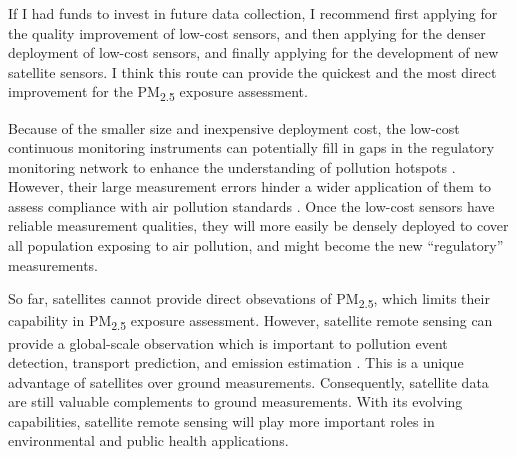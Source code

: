 \documentclass[11pt]{article}
\newcommand{\tsub}{\textsubscript}
\begin{document}
\begin{enumerate*}[{[a)]}]
    \item If I had funds to invest in future data collection, I recommend first applying for the quality improvement of low-cost sensors, and then applying for the denser deployment of low-cost sensors, and finally applying for the development of new satellite sensors. I think this route can provide the quickest and the most direct improvement for the PM\tsub{2.5} exposure assessment. 
    
    Because of the smaller size and inexpensive deployment cost, the low-cost continuous monitoring instruments can potentially fill in gaps in the regulatory monitoring network to enhance the understanding of pollution hotspots \citep{gao2015distributed}. However, their large measurement errors hinder a wider application of them to assess compliance with air pollution standards \citep{hall2014integrating}. Once the low-cost sensors have reliable measurement qualities, they will more easily be densely deployed to cover all population exposing to air pollution, and might become the new ``regulatory'' measurements. 
    
    So far, satellites cannot provide direct obsevations of PM\tsub{2.5}, which limits their capability in PM\tsub{2.5} exposure assessment. However, satellite remote sensing can provide a global-scale observation which is important to pollution event detection, transport prediction, and emission estimation \citep{hoff2009remote}. This is a unique advantage of satellites over ground measurements. Consequently, satellite data are still valuable complements to ground measurements. With its evolving capabilities, satellite remote sensing will play more important roles in environmental and public health applications. 
\end{enumerate*}
\end{document}
